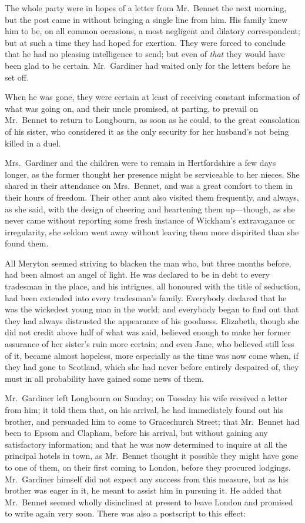 \documentclass[12pt,english,oneside]{book}
\begin{document}
The whole party were in hopes of a letter from Mr.\ Bennet the next
morning, but the post came in without bringing a single line from
him. His family knew him to be, on all common occasions, a most negligent
and dilatory correspondent; but at such a time they had hoped for
exertion. They were forced to conclude that he had no pleasing intelligence
to send; but even of \textit{that} they would have been glad to be
certain. Mr.\ Gardiner had waited only for the letters before he
set off.

When he was gone, they were certain at least of receiving constant
information of what was going on, and their uncle promised, at parting,
to prevail on Mr.\ Bennet to return to Longbourn, as soon as he could,
to the great consolation of his sister, who considered it as the only
security for her husband's not being killed in a duel.

Mrs.\ Gardiner and the children were to remain in Hertfordshire a
few days longer, as the former thought her presence might be serviceable
to her nieces. She shared in their attendance on Mrs.\ Bennet, and
was a great comfort to them in their hours of freedom. Their other
aunt also visited them frequently, and always, as she said, with the
design of cheering and heartening them up\mbox{---}though, as she
never came without reporting some fresh instance of Wickham's extravagance
or irregularity, she seldom went away without leaving them more dispirited
than she found them.

All Meryton seemed striving to blacken the man who, but three months
before, had been almost an angel of light. He was declared to be in
debt to every tradesman in the place, and his intrigues, all honoured
with the title of seduction, had been extended into every tradesman's
family. Everybody declared that he was the wickedest young man in
the world; and everybody began to find out that they had always distrusted
the appearance of his goodness. Elizabeth, though she did not credit
above half of what was said, believed enough to make her former assurance
of her sister's ruin more certain; and even Jane, who believed still
less of it, became almost hopeless, more especially as the time was
now come when, if they had gone to Scotland, which she had never before
entirely despaired of, they must in all probability have gained some
news of them.

Mr.\ Gardiner left Longbourn on Sunday; on Tuesday his wife received
a letter from him; it told them that, on his arrival, he had immediately
found out his brother, and persuaded him to come to Gracechurch Street;
that Mr.\ Bennet had been to Epsom and Clapham, before his arrival,
but without gaining any satisfactory information; and that he was
now determined to inquire at all the principal hotels in town, as
Mr.\ Bennet thought it possible they might have gone to one of them,
on their first coming to London, before they procured lodgings. Mr.\ Gardiner
himself did not expect any success from this measure, but as his brother
was eager in it, he meant to assist him in pursuing it. He added that
Mr.\ Bennet seemed wholly disinclined at present to leave London
and promised to write again very soon. There was also a postscript
to this effect:
\end{document}
